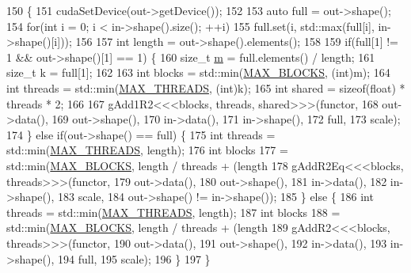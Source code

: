 \begin{DoxyCode}
150                                                                     \{
151   cudaSetDevice(out->getDevice());
152 
153   \textcolor{keyword}{auto} full = out->shape();
154   \textcolor{keywordflow}{for}(\textcolor{keywordtype}{int} i = 0; i < in->shape().size(); ++i)
155     full.set(i, std::max(full[i], in->shape()[i]));
156 
157   \textcolor{keywordtype}{int} length = out->shape().elements();
158 
159   \textcolor{keywordflow}{if}(full[1] != 1 && out->shape()[1] == 1) \{
160     \textcolor{keywordtype}{size\_t} \hyperlink{namespacefix__hard_aeddecc2eb0c9f49a568cb1bf69ac50f5}{m} = full.elements() / length;
161     \textcolor{keywordtype}{size\_t} k = full[1];
162 
163     \textcolor{keywordtype}{int} blocks = std::min(\hyperlink{matrix__functions_8h_aba7f789f3266685ad8840806656e3692}{MAX\_BLOCKS}, (\textcolor{keywordtype}{int})m);
164     \textcolor{keywordtype}{int} threads = std::min(\hyperlink{matrix__functions_8h_a8b5173357adb02a86c027316e0acdfa0}{MAX\_THREADS}, (\textcolor{keywordtype}{int})k);
165     \textcolor{keywordtype}{int} shared = \textcolor{keyword}{sizeof}(float) * threads * 2;
166 
167     gAdd1R2<<<blocks, threads, shared>>>(functor,
168                                          out->data(),
169                                          out->shape(),
170                                          in->data(),
171                                          in->shape(),
172                                          full,
173                                          scale);
174   \} \textcolor{keywordflow}{else} \textcolor{keywordflow}{if}(out->shape() == full) \{
175     \textcolor{keywordtype}{int} threads = std::min(\hyperlink{matrix__functions_8h_a8b5173357adb02a86c027316e0acdfa0}{MAX\_THREADS}, length);
176     \textcolor{keywordtype}{int} blocks
177         = std::min(\hyperlink{matrix__functions_8h_aba7f789f3266685ad8840806656e3692}{MAX\_BLOCKS}, length / threads + (length %
178     gAddR2Eq<<<blocks, threads>>>(functor,
179                                   out->data(),
180                                   out->shape(),
181                                   in->data(),
182                                   in->shape(),
183                                   scale,
184                                   out->shape() != in->shape());
185   \} \textcolor{keywordflow}{else} \{
186     \textcolor{keywordtype}{int} threads = std::min(\hyperlink{matrix__functions_8h_a8b5173357adb02a86c027316e0acdfa0}{MAX\_THREADS}, length);
187     \textcolor{keywordtype}{int} blocks
188         = std::min(\hyperlink{matrix__functions_8h_aba7f789f3266685ad8840806656e3692}{MAX\_BLOCKS}, length / threads + (length %
189     gAddR2<<<blocks, threads>>>(functor,
190                                 out->data(),
191                                 out->shape(),
192                                 in->data(),
193                                 in->shape(),
194                                 full,
195                                 scale);
196   \}
197 \}
\end{DoxyCode}


